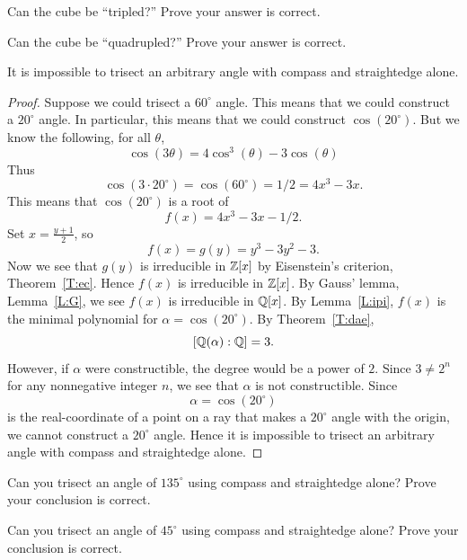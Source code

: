 \documentclass{ximera}
\begin{document}
\begin{exercise}
  Can the cube be ``tripled?'' Prove your answer is correct.
\end{exercise}


\begin{exercise}
  Can the cube be ``quadrupled?'' Prove your answer is correct.
\end{exercise}




\begin{example}
It is impossible to trisect an arbitrary angle with compass and
straightedge alone.
\begin{proof}
  Suppose we could trisect a $60^\circ$ angle. This means that we could
  construct a $20^\circ$ angle. In particular, this means that we could
  construct $\cos(20^\circ)$. But we know the following, for all $\theta$, 
  \[
  \cos(3\theta) =  4\cos^3(\theta) -3 \cos(\theta)
  \]
  Thus
  \[
  \cos(3\cdot20^\circ) = \cos(60^\circ) = 1/2 = 4x^3 -3x.
  \]
  This means that $\cos(20^\circ)$ is a root of
  \[
  f(x)=4x^3 -3x -1/2.
  \]
  Set $x = \frac{y+1}{2}$, so
  \[
  f(x) = g(y) = y^3-3y^2-3.
  \]
  Now we see that $g(y)$ is irreducible in $\mathbb Z[x]$ by Eisenstein's
  criterion, Theorem~\ref{T:ec}. Hence $f(x)$ is irreducible in
  $\mathbb Z[x]$. By Gauss' lemma, Lemma~\ref{L:G}, we see $f(x)$ is
  irreducible in $\mathbb Q[x]$.  By Lemma~\ref{L:ipi}, $f(x)$ is the minimal
  polynomial for $\alpha=\cos(20^\circ)$. By Theorem~\ref{T:dae},
  \[
    [\mathbb Q(\alpha):\mathbb Q]=3.
    \]
    However, if $\alpha$ were constructible, the
    degree would be a power of $2$. Since $3\ne 2^n$ for any nonnegative
    integer $n$, we see that $\alpha$ is not constructible. Since
    \[
    \alpha = \cos(20^\circ) 
    \]
    is the real-coordinate of a point on a ray that makes a $20^\circ$
    angle with the origin, we cannot construct a $20^\circ$
    angle. Hence it is impossible to trisect an arbitrary angle with
    compass and straightedge alone.
\end{proof}
\end{example}


\begin{exercise}
  Can you trisect an angle of $135^\circ$ using compass and
  straightedge alone? Prove your conclusion is correct.
\end{exercise}

\begin{exercise}
  Can you trisect an angle of $45^\circ$ using compass and
  straightedge alone? Prove your conclusion is correct.
\end{exercise}
\end{document}

